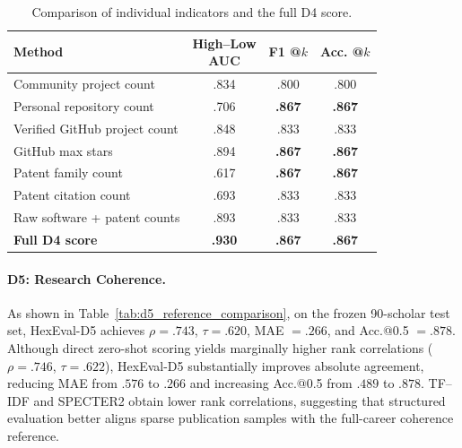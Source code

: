\documentclass[letterpaper]{article} %
\begin{document}
\begin{table}[t]
\centering
{\small
\setlength{\tabcolsep}{1mm}
\begin{tabular}{@{}p{}ccc@{}}
\toprule
\textbf{Method}
& \shortstack{\textbf{High--Low}\\\textbf{AUC}}
& \shortstack{\textbf{F1}\\\textbf{@$k$}}
& \shortstack{\textbf{Acc.}\\\textbf{@$k$}} \\
\midrule
Community project count
& .834 & .800 & .800 \\
Personal repository count
& .706 & \textbf{.867} & \textbf{.867} \\
Verified GitHub project count
& .848 & .833 & .833 \\
GitHub max stars
& .894 & \textbf{.867} & \textbf{.867} \\
Patent family count
& .617 & \textbf{.867} & \textbf{.867} \\
Patent citation count
& .693 & .833 & .833 \\
Raw software + patent counts
& .893 & .833 & .833 \\
\textbf{Full D4 score}
& \textbf{.930} & \textbf{.867} & \textbf{.867} \\
\bottomrule
\end{tabular}
}
\caption{Comparison of individual indicators and the full D4 score.}
\label{tab:d4_indicator_comparison}
\end{table}


\paragraph{D5: Research Coherence.}
As shown in Table~\ref{tab:d5_reference_comparison}, on the frozen
90-scholar test set, HexEval-D5 achieves $\rho=.743$, $\tau=.620$,
MAE $=.266$, and Acc.@0.5 $=.878$. Although direct zero-shot scoring
yields marginally higher rank correlations ($\rho=.746$, $\tau=.622$),
HexEval-D5 substantially improves absolute agreement, reducing MAE from
$.576$ to $.266$ and increasing Acc.@0.5 from $.489$ to $.878$.
TF--IDF and SPECTER2 obtain lower rank correlations, suggesting that
structured evaluation better aligns sparse publication samples with the
full-career coherence reference.
\end{document}
